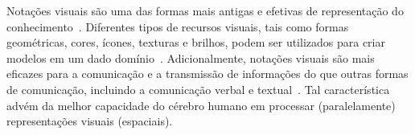 


Notações visuais são uma das formas mais antigas e efetivas de representação do conhecimento~\cite{DAVIES-1990-Egyptian-Hieroglyphs, MATHEWS-Classic-1991-Maya_Emblem_Glyphs, KAMESWARA-2005-Prehistoric-Astronomy-India}. Diferentes tipos de recursos visuais, tais como formas geométricas, cores, ícones, texturas e brilhos, podem ser utilizados para criar modelos em um dado domínio~\cite{SMITH-MORIARTY-KENNEY-BARBATSIS-2004-Handbook-Visual-Communication, MOODY-2009-Physics-Notation}. Adicionalmente, notações visuais são mais eficazes para a comunicação e a transmissão de informações do que outras formas de comunicação, incluindo a comunicação verbal e textual~\cite{MOODY-2009-Physics-Notation}. Tal característica advém da melhor capacidade do cérebro humano em processar (paralelamente) representações visuais (espaciais).


